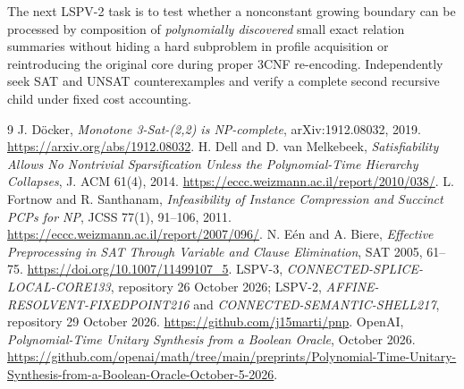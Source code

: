 \documentclass[11pt]{article}
\begin{document}
The next LSPV-2 task is to test whether a nonconstant growing boundary can be processed by composition of \emph{polynomially discovered} small exact relation summaries without hiding a hard subproblem in profile acquisition or reintroducing the original core during proper 3CNF re-encoding. Independently seek SAT and UNSAT counterexamples and verify a complete second recursive child under fixed cost accounting.

\begin{thebibliography}{9}
 J. D\"ocker, \emph{Monotone 3-Sat-(2,2) is NP-complete}, arXiv:1912.08032, 2019. \url{https://arxiv.org/abs/1912.08032}.
 H. Dell and D. van Melkebeek, \emph{Satisfiability Allows No Nontrivial Sparsification Unless the Polynomial-Time Hierarchy Collapses}, J. ACM 61(4), 2014. \url{https://eccc.weizmann.ac.il/report/2010/038/}.
 L. Fortnow and R. Santhanam, \emph{Infeasibility of Instance Compression and Succinct PCPs for NP}, JCSS 77(1), 91--106, 2011. \url{https://eccc.weizmann.ac.il/report/2007/096/}.
 N. E\'en and A. Biere, \emph{Effective Preprocessing in SAT Through Variable and Clause Elimination}, SAT 2005, 61--75. \url{https://doi.org/10.1007/11499107_5}.
 LSPV-3, \emph{CONNECTED-SPLICE-LOCAL-CORE133}, repository 26 October 2026; LSPV-2, \emph{AFFINE-RESOLVENT-FIXEDPOINT216} and \emph{CONNECTED-SEMANTIC-SHELL217}, repository 29 October 2026. \url{https://github.com/j15marti/pnp}.
 OpenAI, \emph{Polynomial-Time Unitary Synthesis from a Boolean Oracle}, October 2026. \url{https://github.com/openai/math/tree/main/preprints/Polynomial-Time-Unitary-Synthesis-from-a-Boolean-Oracle-October-5-2026}.
\end{thebibliography}
\end{document}
